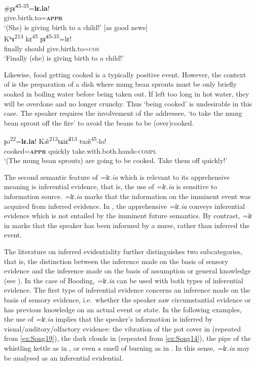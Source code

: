 \documentclass[output=paper,colorlinks,citecolor=brown, language=chinese]{langscibook}
\begin{document}
\ea \label{ex:Song25}
\ea \label{ex:Song25a}
\gll \#ʂ\~ɤ\textsuperscript{45-35}=\textbf{lɛ.ia}! \\
give.birth.to=\textsc{\textbf{appr}} \\
\glt `(She) is giving birth to a child!' [as good news] \\
\ex \label{ex:Song25b}
\gll Kʰɤ\textsuperscript{213} kɛ\textsuperscript{45} ʂ\~ɤ\textsuperscript{45-35}=lɛ! \\
finally should give.birth.to=\textsc{cos} \\
\glt `Finally (she) is giving birth to a child!'
\z
\z

 Likewise, food getting cooked is a typically positive event. However, the context of  is the preparation of a dish where mung bean sprouts must be only briefly soaked in boiling water before being taken out. If left too long in hot water, they will be overdone and no longer crunchy. Thus `being cooked' is undesirable in this case. The speaker requires the involvement of the addressee, `to take the mung bean sprout off the fire' to avoid the beans to be (over)cooked.


\ea\label{ex:Song26}
\gll ʂo\textsuperscript{22}=\textbf{lɛ.ia}! K\~æ\textsuperscript{213}tɕi\~ɛ\textsuperscript{213} tu\~æ\textsuperscript{45}-lo! \\
cooked=\textsc{\textbf{appr}} quickly take.with.both.hands-\textsc{compl} \\
\glt `(The mung bean sprouts) are going to be cooked. Take them off quickly!'
\z

 The second semantic feature of \textit{=lɛ.ia} which is relevant to its apprehensive meaning is inferential evidence, that is, the use of \textit{=lɛ.ia} is sensitive to information source. \textit{=lɛ.ia} marks that the information on the imminent event was acquired from inferred evidence. In , the apprehensive \textit{=lɛ.ia} conveys inferential evidence which is not entailed by the imminent future semantics. By contrast, \textit{=lɛ} in  marks that the speaker has been informed by a nurse, rather than inferred the event.

The literature on inferred evidentiality further distinguishes two subcategories, that is, the distinction between the inference made on the basis of sensory evidence and the inference made on the basis of assumption or general knowledge (see \cite[64, 174--176]{Aikhenvald2004}). In the case of Baoding, \textit{=lɛ.ia} can be used with both types of inferential evidence. The first type of inferential evidence concerns an inference made on the basis of sensory evidence, i.e.\  whether the speaker saw circumstantial evidence or has previous knowledge on an actual event or state. In the following examples, the use of \textit{=lɛ.ia} implies that the speaker's information is inferred by visual/auditory/olfactory evidence: the vibration of the pot cover in  (repeated from \ref{ex:Song19}), the dark clouds in  (repeated from \ref{ex:Song14}), the pipe of the whistling kettle as in , or even a smell of burning as in . In this sense, \textit{=lɛ.ia} may be analysed as an inferential evidential.
\end{document}
